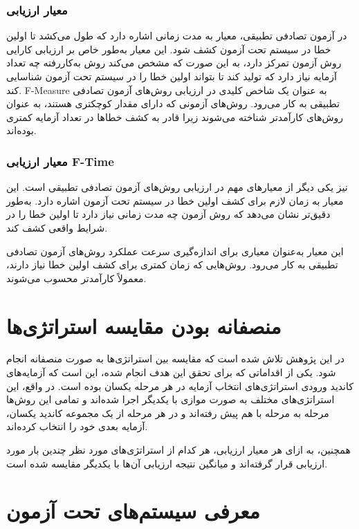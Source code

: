 \subsubsection{معیار ارزیابی }

در آزمون تصادفی تطبیقی، معیار  به مدت زمانی اشاره دارد که طول می‌کشد تا اولین خطا در سیستم تحت آزمون کشف شود. این معیار به‌طور خاص بر ارزیابی کارایی روش آزمون تمرکز دارد، به این صورت که مشخص می‌کند روش به‌کاررفته چه تعداد آزمایه نیاز دارد که تولید کند تا بتواند اولین خطا را در سیستم تحت آزمون شناسایی کند. F-Measure به عنوان یک شاخص کلیدی در ارزیابی روش‌های آزمون تصادفی تطبیقی به کار می‌رود. روش‌های آزمونی که دارای مقدار  کوچکتری هستند، به عنوان روش‌های کارآمدتر شناخته می‌شوند زیرا قادر به کشف خطاها در تعداد آزمایه کمتری بوده‌اند.

\subsubsection{معیار ارزیابی F-Time}

 نیز یکی دیگر از معیارهای مهم در ارزیابی روش‌های آزمون تصادفی تطبیقی است. این معیار به زمان لازم برای کشف اولین خطا در سیستم تحت آزمون اشاره دارد.  به‌طور دقیق‌تر نشان می‌دهد که روش آزمون چه مدت زمانی نیاز دارد تا اولین خطا را در شرایط واقعی کشف کند.

این معیار به‌عنوان معیاری برای اندازه‌گیری سرعت عملکرد روش‌های آزمون تصادفی تطبیقی به کار می‌رود. روش‌هایی که زمان کمتری برای کشف اولین خطا نیاز دارند، معمولاً کارآمدتر محسوب می‌شوند.

\section{منصفانه بودن مقایسه استراتژی‌ها}

در این پژوهش تلاش شده است که مقایسه بین استراتژی‌ها به صورت منصفانه انجام شود. یکی از اقداماتی که برای تحقق این هدف انجام شده، این است که آزمایه‌های کاندید ورودی استراتژی‌های انتخاب آزمایه در هر مرحله یکسان بوده است. در واقع، این استراتژی‌های مختلف به صورت موازی با یکدیگر اجرا شده‌اند و تمامی این روش‌ها مرحله به مرحله با هم پیش رفته‌اند و در هر مرحله از یک مجموعه کاندید یکسان، آزمایه بعدی خود را انتخاب کرده‌اند.

همچنین، به ازای هر معیار ارزیابی، هر کدام از استراتژی‌های مورد نظر چندین بار مورد ارزیابی قرار گرفته‌اند و میانگین نتیجه ارزیابی آن‌ها با یکدیگر مقایسه شده است.

\section{معرفی سیستم‌های تحت آزمون}

